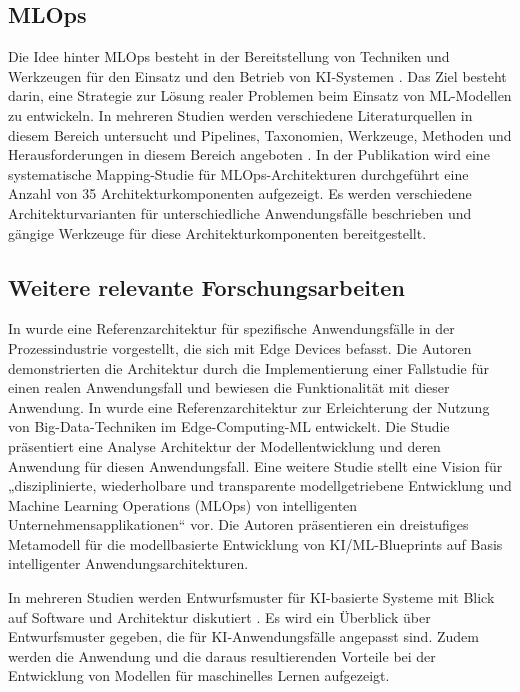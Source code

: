 \documentclass[11pt,a4paper,pointlessnumbers]{scrartcl}
\theoremstyle{break}
\numberwithin{equation}{section}
\begin{document}
\subsection{MLOps} 
Die Idee hinter MLOps besteht in der Bereitstellung von Techniken und Werkzeugen für den Einsatz und den Betrieb von KI-Systemen \cite{symeonidisMLOpsDefinitionsTools2022}. Das Ziel besteht darin, eine Strategie zur Lösung realer Problemen beim Einsatz von ML-Modellen zu entwickeln. In mehreren Studien werden verschiedene Literaturquellen in diesem Bereich untersucht und Pipelines, Taxonomien, Werkzeuge, Methoden und Herausforderungen in diesem Bereich angeboten \cite{testiMLOpsTaxonomyMethodology2022,kreuzbergerMachineLearningOperations2023,steidlPipelineContinuousDevelopment2023}. 
In der Publikation \cite{najafabadiAnalysisMLOpsArchitectures2024} wird eine systematische Mapping-Studie für MLOps-Architekturen durchgeführt eine Anzahl von 35 Architekturkomponenten aufgezeigt. Es werden verschiedene Architekturvarianten für unterschiedliche Anwendungsfälle beschrieben und gängige Werkzeuge für diese Architekturkomponenten bereitgestellt.

\subsection{Weitere relevante Forschungsarbeiten}
In \cite{wostmannConceptionReferenceArchitecture2020} wurde eine Referenzarchitektur für spezifische Anwendungsfälle in der Prozessindustrie vorgestellt, die sich mit Edge Devices befasst. Die Autoren demonstrierten die Architektur durch die Implementierung einer Fallstudie für einen realen Anwendungsfall und bewiesen die Funktionalität mit dieser Anwendung. 	
In \cite{paakkonenExtendingReferenceArchitecture2020} wurde eine Referenzarchitektur zur Erleichterung der Nutzung von Big-Data-Techniken im Edge-Computing-ML entwickelt. Die Studie präsentiert eine Analyse Architektur der Modellentwicklung und deren Anwendung für diesen Anwendungsfall. 
Eine weitere Studie \cite{vandenheuvelModelDrivenMLOpsIntelligent2020} stellt eine Vision für „disziplinierte, wiederholbare und transparente modellgetriebene Entwicklung und Machine Learning Operations (MLOps) von intelligenten Unternehmensapplikationen“ vor. Die Autoren präsentieren ein dreistufiges Metamodell für die modellbasierte Entwicklung von KI/ML-Blueprints auf Basis intelligenter Anwendungsarchitekturen.

In mehreren Studien werden Entwurfsmuster für KI-basierte Systeme mit Blick auf Software und Architektur diskutiert \cite{heilandDesignPatternsAIbased2023,sharmaDesignPatternsMachine2019,cabralInvestigatingImpactSOLID2024,takeSoftwareDesignPatterns2021}. Es wird ein Überblick über Entwurfsmuster gegeben, die für KI-Anwendungsfälle angepasst sind. Zudem werden die Anwendung und die daraus resultierenden Vorteile bei der Entwicklung von Modellen für maschinelles Lernen aufgezeigt.
\end{document}
